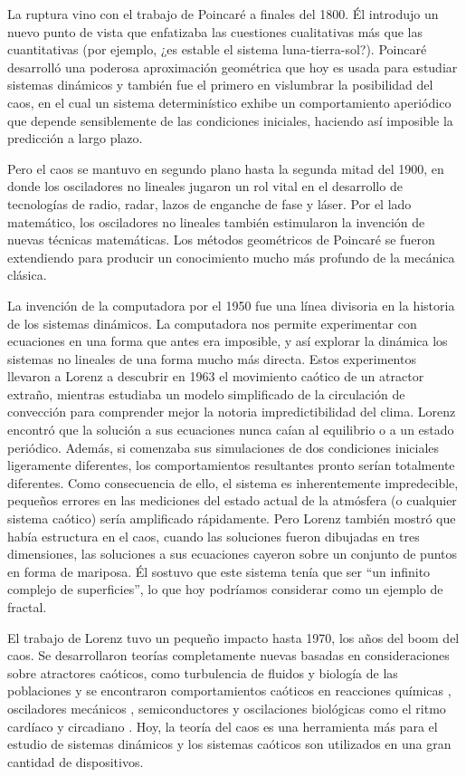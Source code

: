 La ruptura vino con el trabajo de Poincaré a finales del 1800.
Él introdujo un nuevo punto de vista que enfatizaba las cuestiones cualitativas más que las cuantitativas (por ejemplo, ¿es estable el sistema luna-tierra-sol?).
Poincaré desarrolló una poderosa aproximación geométrica que hoy es usada para estudiar sistemas dinámicos y también fue el primero en vislumbrar la posibilidad del caos, en el cual un sistema determinístico exhibe un comportamiento aperiódico que depende sensiblemente de las condiciones iniciales, haciendo así imposible la predicción a largo plazo.

Pero el caos se mantuvo en segundo plano hasta la segunda mitad del 1900, en donde los osciladores no lineales jugaron un rol vital en el desarrollo de tecnologías de radio, radar, lazos de enganche de fase y láser.
Por el lado matemático, los osciladores no lineales también estimularon la invención de nuevas técnicas matemáticas.
Los métodos geométricos de Poincaré se fueron extendiendo para producir un conocimiento mucho más profundo de la mecánica clásica.

La invención de la computadora por el 1950 fue una línea divisoria en la historia de los sistemas dinámicos.
La computadora nos permite experimentar con ecuaciones en una forma que antes era imposible, y así explorar la dinámica los sistemas no lineales de una forma mucho más directa.
Estos experimentos llevaron a Lorenz a descubrir en 1963 el movimiento caótico de un atractor extraño, mientras estudiaba un modelo simplificado de la circulación de convección para comprender mejor la notoria impredictibilidad del clima.
Lorenz encontró que la solución a sus ecuaciones nunca caían al equilibrio o a un estado periódico.
Además, si comenzaba sus simulaciones de dos condiciones iniciales ligeramente diferentes, los comportamientos resultantes pronto serían
totalmente diferentes.
Como consecuencia de ello, el sistema es inherentemente impredecible, pequeños errores en las mediciones del estado actual de la atmósfera (o cualquier sistema caótico) sería amplificado rápidamente.
Pero Lorenz también mostró que había estructura en el caos, cuando las soluciones fueron dibujadas en tres dimensiones, las soluciones a sus ecuaciones cayeron sobre un conjunto de puntos en forma de mariposa.
Él sostuvo que este sistema tenía que ser “un infinito complejo de superficies”, lo que hoy podríamos considerar como un ejemplo de fractal.

El trabajo de Lorenz tuvo un pequeño impacto hasta 1970, los años del boom del caos.
Se desarrollaron teorías completamente nuevas basadas en consideraciones sobre atractores caóticos, como turbulencia de fluidos y biología de las poblaciones y se encontraron comportamientos caóticos en reacciones químicas \cite{Kapral1995}, osciladores mecánicos \cite{Awrejcewicz2003}, semiconductores \cite{Scholl2001} y oscilaciones biológicas como el ritmo cardíaco y circadiano \cite{Strogatz2018}.
Hoy, la teoría del caos es una herramienta más para el estudio de sistemas dinámicos y los sistemas caóticos son utilizados en una gran cantidad de dispositivos.

